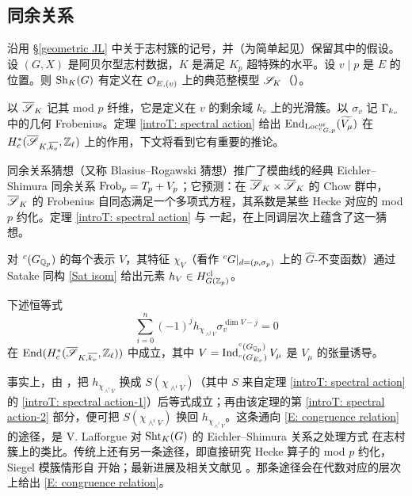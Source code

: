 
\subsection{同余关系}\label{S: Congruence}

沿用 \S\ref{geometric JL} 中关于志村簇的记号，并（为简单起见）保留其中的假设。设 $(G,X)$ 是阿贝尔型志村数据，$K$ 是满足 $K_p$ 超特殊的水平。设 $v\mid p$ 是 $E$ 的位置。则 ${\operatorname{Sh}}_K(G)$ 有定义在 ${\mathcal O}_{E,(v)}$ 上的典范整模型 ${\mathscr S}_K$（\cite{Kisin-Integral-Model}）。

以 $\overline{{\mathscr S}}_K$ 记其 mod $p$ 纤维，它是定义在 $v$ 的剩余域 $k_v$ 上的光滑簇。以 $\sigma_v$ 记 ${\Gamma}_{k_v}$ 中的几何 Frobenius。定理 \ref{introT: spectral action} 给出 ${\operatorname{End}}_{{\operatorname{Loc}}_{{}^cG,p}^{{\operatorname{ur}}}}(\widetilde{V_\mu})$ 在 $H^*_c(\overline{{\mathscr S}}_{K,\overline{k_v}},{\mathbb Z}_\ell)$ 上的作用，下文将看到它有重要的推论。

同余关系猜想（又称 Blasius--Rogawski 猜想）推广了模曲线的经典 Eichler--Shimura 同余关系 ${\operatorname{Frob}}_p=T_p+V_p$；它预测：在 $\overline{{\mathscr S}}_K\times \overline{{\mathscr S}}_K$ 的 Chow 群中，$\overline{{\mathscr S}}_K$ 的 Frobenius 自同态满足一个多项式方程，其系数是某些 Hecke 对应的 mod $p$ 约化。定理 \ref{introT: spectral action} 与 \cite[Sect. 6.3]{Xiao-Zhu-Invariants} 一起，在上同调层次上蕴含了这一猜想。

对 ${}^c(G_{{\mathbb Q}_p})$ 的每个表示 $V$，其特征 $\chi_V$（看作 ${}^cG|_{d=(p,\sigma_p)}$ 上的 $\hat{G}$-不变函数）通过 Satake 同构 \eqref{Sat isom} 给出元素 $h_V\in H_{G({\mathbb Z}_p)}^{{\operatorname{cl}}}$。

\begin{thm}
下述恒等式
\begin{equation}\label{E: congruence relation}
\sum_{i=0}^{n}(-1)^j h_{\chi_{\wedge ^j V}} \sigma_v^{\dim V-j}=0
\end{equation}
在 ${\operatorname{End}} (H^*_c(\overline{{\mathscr S}}_{K ,\overline{k_v}},{\mathbb Z}_\ell))$ 中成立，其中 $V=\operatorname{Ind}_{{}^c(G_{E_v})}^{{}^c(G_{{\mathbb Q}_p})}V_\mu$ 是 $V_\mu$ 的张量诱导。
\end{thm}

事实上，由 \cite[Sect. 6.3]{Xiao-Zhu-Invariants}，把 $h_{\chi_{\wedge ^i V}}$ 换成 $S(\chi_{\wedge ^i V})$（其中 $S$ 来自定理 \ref{introT: spectral action} 的 \eqref{introT: spectral action-1}）后等式成立；再由该定理的第 \eqref{introT: spectral action-2} 部分，便可把 $S(\chi_{\wedge ^i V})$ 换回 $h_{\chi_{\wedge ^i V}}$。这条通向 \eqref{E: congruence relation} 的途径，是 V. Lafforgue 对 ${\operatorname{Sht}}_K(G)$ 的 Eichler--Shimura 关系之处理方式 \cite{Lafforgue-Automorphic-to-Galois} 在志村簇上的类比。传统上还有另一条途径，即直接研究 Hecke 算子的 mod $p$ 约化，Siegel 模簇情形自 \cite{Faltings-Chai-Abelian} 开始；最新进展及相关文献见 \cite{Lee-ES-Relation}。那条途径会在代数对应的层次上给出 \eqref{E: congruence relation}。

